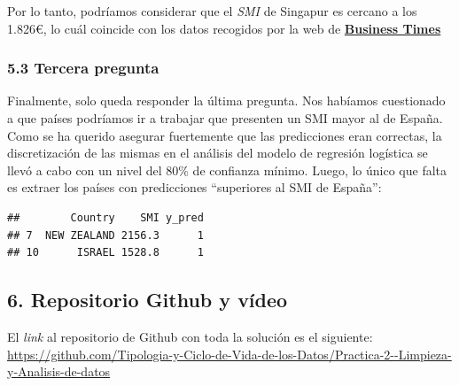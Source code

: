 \documentclass[
]{article}
\newenvironment{Shaded}{\begin{snugshade}}{\end{snugshade}}
\newcommand{\AttributeTok}[1]{\textcolor[rgb]{0.13,0.29,0.53}{#1}}
\newcommand{\CommentTok}[1]{\textcolor[rgb]{0.56,0.35,0.01}{\textit{#1}}}
\newcommand{\DecValTok}[1]{\textcolor[rgb]{0.00,0.00,0.81}{#1}}
\newcommand{\FunctionTok}[1]{\textcolor[rgb]{0.13,0.29,0.53}{\textbf{#1}}}
\newcommand{\NormalTok}[1]{#1}
\newcommand{\OtherTok}[1]{\textcolor[rgb]{0.56,0.35,0.01}{#1}}
\newcommand{\SpecialCharTok}[1]{\textcolor[rgb]{0.81,0.36,0.00}{\textbf{#1}}}
\begin{document}
Por lo tanto, podríamos considerar que el \emph{SMI} de Singapur es
cercano a los 1.826€, lo cuál coincide con los datos recogidos por la
web de
\href{https://www.businesstimes.com.sg/singapore/economy-policy/12000-lower-wage-food-service-workers-earn-least-s1750-mar-1}{\textbf{Business
Times}}

\hypertarget{tercera-pregunta}{%
\subsubsection{5.3 Tercera pregunta}\label{tercera-pregunta}}

Finalmente, solo queda responder la última pregunta. Nos habíamos
cuestionado a que países podríamos ir a trabajar que presenten un SMI
mayor al de España. Como se ha querido asegurar fuertemente que las
predicciones eran correctas, la discretización de las mismas en el
análisis del modelo de regresión logística se llevó a cabo con un nivel
del 80\% de confianza mínimo. Luego, lo único que falta es extraer los
países con predicciones ``superiores al SMI de España'':

\begin{Shaded}
\end{Shaded}

\begin{verbatim}
##        Country    SMI y_pred
## 7  NEW ZEALAND 2156.3      1
## 10      ISRAEL 1528.8      1
\end{verbatim}

\hypertarget{repositorio-github-y-vuxeddeo}{%
\subsection{6. Repositorio Github y
vídeo}\label{repositorio-github-y-vuxeddeo}}

El \emph{link} al repositorio de Github con toda la solución es el
siguiente:\\
\url{https://github.com/Tipologia-y-Ciclo-de-Vida-de-los-Datos/Practica-2--Limpieza-y-Analisis-de-datos}
\end{document}

